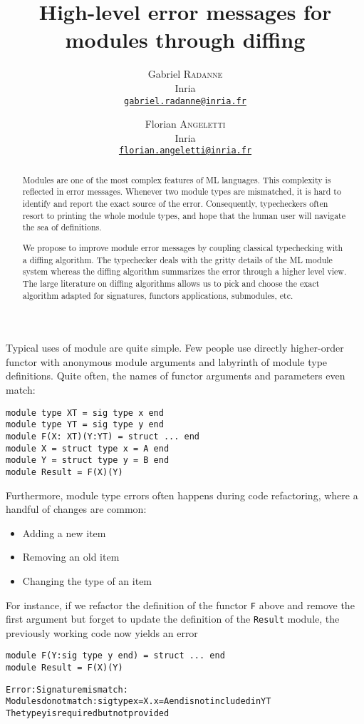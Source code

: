 \documentclass[a4paper,11pt]{scrartcl}
\title{High-level error messages for modules through diffing}
\author{
  Gabriel \textsc{Radanne}\\
  Inria\\
  \href{mailto:gabriel.radanne@inria.fr}
  {\nolinkurl{gabriel.radanne@inria.fr}}
  \and
  Florian \textsc{Angeletti}\\
  Inria\\
  \href{mailto:florian.angeletti@inria.fr}
  {\nolinkurl{florian.angeletti@inria.fr}}
}
\date{}
\begin{document}
\maketitle

\begin{abstract}
Modules are one of the most complex features of ML languages. This complexity is reflected in error messages.
Whenever two module types are mismatched, it is hard to identify and report the exact source of the error.
Consequently, typecheckers often resort to printing the whole module types, and hope that the human user will navigate the sea of definitions.

We propose to improve module error messages by coupling classical typechecking with
a diffing algorithm.
The typechecker deals with the gritty details of
the ML module system whereas the diffing algorithm summarizes the error through
a higher level view.
The large literature on diffing algorithms allows us to pick and choose
the exact algorithm adapted for signatures, functors applications, submodules, etc.
\end{abstract}


Typical uses of module are quite simple. Few people use directly higher-order functor with anonymous module arguments and labyrinth of module type definitions. Quite often, the names of functor arguments and parameters even match:
\begin{verbatim}
module type XT = sig type x end
module type YT = sig type y end
module F(X: XT)(Y:YT) = struct ... end
module X = struct type x = A end
module Y = struct type y = B end
module Result = F(X)(Y)
\end{verbatim}

Furthermore, module type errors often happens during code refactoring, where a handful of changes are common:
\begin{itemize}
\item Adding a new item
\item Removing an old item
\item Changing the type of an item
\end{itemize}

For instance, if we refactor the definition of the functor \texttt{F} above and remove the first argument
but forget to update the definition of the \texttt{Result} module, the previously working code
now yields an error

\begin{verbatim}
module F(Y:sig type y end) = struct ... end
module Result = F(X)(Y)
\end{verbatim}
\begin{alltt}
Error: Signature mismatch:
       Modules do not match: sig type x = X.x = A end is not included in YT
       The type y is required but not provided
\end{alltt}
\end{document}
